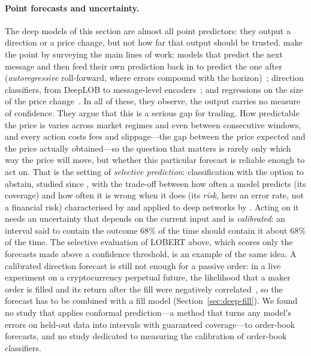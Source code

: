 \paragraph{Point forecasts and uncertainty.} The deep models of this section are almost all point
predictors: they output a direction or a price change, but not how far that output should be trusted.
\citet{manoharan2026uqlob} make the point by surveying the main lines of work: models that predict the next
message and then feed their own prediction back in to predict the one after (\emph{autoregressive} roll-forward,
where errors compound with the horizon)~\citep{nagy2023}; direction classifiers, from DeepLOB to message-level
encoders~\citep{zhang2019,tran2019tabl,wallbridge2020,lit2025,linna2025lobert}; and regressions on the size of the
price change~\citep{yang2025type}. In all of these, they observe, the output carries no measure of confidence.
They argue that this is a serious gap for trading. How predictable the price is
varies across market regimes and even between consecutive windows, and every action costs fees and
slippage---the gap between the price expected and the price actually obtained---so the question that matters is rarely only which way the price will move, but whether this
particular forecast is reliable enough to act on. That is the setting of \emph{selective prediction}:
classification with the option to abstain, studied since \citet{chow1970}, with the trade-off between how
often a model predicts (its coverage) and how often it is wrong when it does (its \emph{risk}, here an error rate,
not a financial risk) characterised by
\citet{elyaniv2010} and applied to deep networks by \citet{geifman2017}. Acting on it needs an uncertainty
that depends on the current input and is \emph{calibrated}: an interval said to contain the outcome 68\%
of the time should contain it about 68\% of the time. The selective evaluation of LOBERT above, which
scores only the forecasts made above a confidence threshold, is an example of the same idea. A calibrated direction
forecast is still not enough for a passive order: in a live experiment on a cryptocurrency perpetual future, the
likelihood that a maker order is filled and its return after the fill were negatively
correlated~\citep{albers2025dilemma}, so the forecast has to be combined with a fill model (Section~\ref{sec:deep-fill}).
We found no study that applies conformal prediction---a method that turns any model's errors on held-out data into
intervals with guaranteed coverage---to order-book forecasts, and no study dedicated to measuring the calibration of
order-book classifiers.

